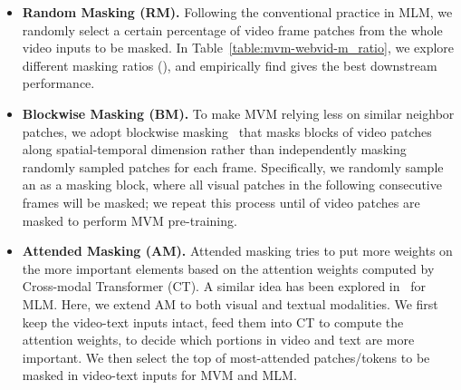 \documentclass[10pt,twocolumn,letterpaper]{article}
\begin{document}
\begin{itemize}[leftmargin=*, topsep=1pt]
    \setlength\itemsep{-3pt}
    \item \textbf{Random Masking (RM).} Following the conventional practice in MLM, we randomly select a certain percentage  of video frame patches from the whole video inputs to be masked. In Table~\ref{table:mvm-webvid-m_ratio}, we explore different masking ratios (), and empirically find  gives the best downstream performance.
    \item \textbf{Blockwise Masking (BM).} To make MVM relying less on similar neighbor patches, we adopt blockwise masking~\cite{tan2021vimpac,bao2022beit} that masks blocks of video patches along spatial-temporal dimension rather than independently masking randomly sampled patches for each frame. Specifically, we randomly sample an  as a masking block, where all  visual patches in the following  consecutive frames will be masked; we repeat this process until  of video patches are masked to perform MVM pre-training. 
    \item \textbf{Attended Masking (AM).} Attended masking tries to put more weights on the more important elements based on the attention weights computed by Cross-modal Transformer (CT). A similar idea has been explored in~\cite{zellers2021merlot} for MLM. Here, we extend AM to both visual and textual modalities. We first keep the video-text inputs intact, feed them into CT to compute the attention weights, to decide which portions in video and text are more important. We then select the top  of most-attended  patches/tokens to be masked in video-text inputs for MVM and MLM.
\end{itemize}
\end{document}
